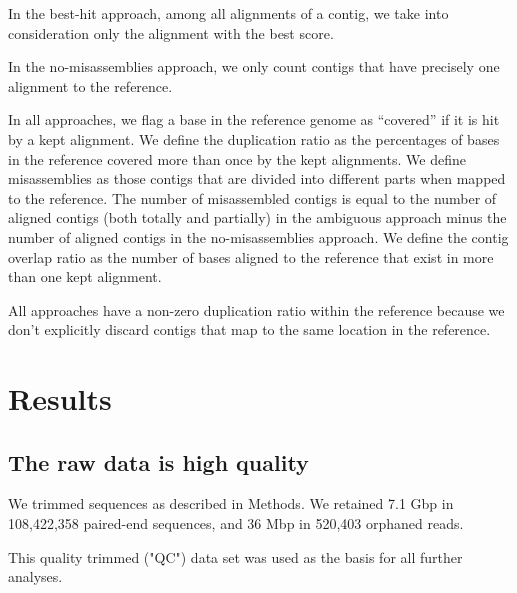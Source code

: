 \documentclass[10pt,a4paper,twocolumn]{article}
\begin{document}
In the best-hit approach, among all alignments of a contig, we take into consideration only the alignment with the best score. 

In the no-misassemblies approach, we only count contigs that have precisely one alignment to the reference. 

In all approaches, we flag a base in the reference genome as ``covered'' if it is hit by a kept alignment.  We define the duplication ratio as the percentages of bases in the reference covered more than once by the kept alignments. We define misassemblies as those contigs that are divided into different parts when mapped to the reference.   The number of misassembled contigs is equal to the number of aligned contigs (both totally and partially) in the ambiguous approach minus the number of aligned contigs in the no-misassemblies approach.  %
We define the contig overlap ratio as the number of bases aligned to the reference that exist in more than one kept alignment. 

All approaches have a non-zero duplication ratio within the reference because we don't explicitly discard contigs that map to the same location in the reference.

\section*{Results}


 
\subsection*{The raw data is high quality}

We trimmed sequences as described in Methods. We retained 7.1 Gbp in 108,422,358 paired-end sequences, and 36 Mbp in 520,403 orphaned reads.  


This quality trimmed ("QC") data set was used as the basis for all further analyses.
\end{document}
